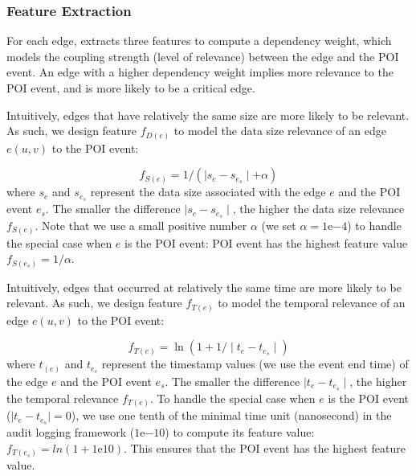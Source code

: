 
\subsubsection{Feature Extraction}
\label{subsubsec:feature-extraction}
For each edge, \tool extracts three features to compute a dependency weight, which models the coupling strength (\ie level of relevance) between the edge and the POI event.
An edge with a higher dependency weight implies more relevance to the POI event, and is more likely to be a critical edge.
%

Intuitively, edges that have relatively the same size are more likely to be relevant.
As such, we design feature $f_{D(e)}$ to model the data size relevance of an edge $e(u, v)$ to the POI event:

\begin{equation}
\label{eq:data-feature}
    f_{S(e)} = 1/(\mid s_{e} - s_{e_s}\mid + \alpha)
\end{equation}
where $s_{e}$ and $s_{e_s}$ represent the data size associated with the edge $e$ and the POI event $e_s$.
The smaller the difference $\mid s_{e} - s_{e_s}\mid$, the higher the data size relevance $f_{S(e)}$.
%
Note that we use a small positive number $\alpha$ (we set $\alpha = 1\mathrm{e}{-4}$) to handle the special case when $e$ is the POI event: POI event has the highest feature value $f_{S(e_s)} = 1/\alpha$.


Intuitively, edges that occurred at relatively the same time are more likely to be relevant.
As such, we design feature $f_{T(e)}$ to model the temporal relevance of an edge $e(u,v)$ to the POI event:

\begin{equation}
\label{eq:time-feature}
    f_{T(e)} = \ln(1 + 1/\mid t_{e} - t_{e_s}\mid)
\end{equation}
where $t_{(e)}$ and $t_{e_s}$ represent the timestamp values (we use the event end time) of the edge $e$ and the POI event $e_s$. 
The smaller the difference $\mid t_{e} - t_{e_s}\mid$, the higher the temporal relevance $f_{T(e)}$.
%
To handle the special case when $e$ is the POI event (\ie $\mid t_{e} - t_{e_s}\mid = 0$), we use one tenth of the minimal time unit (nanosecond) in the audit logging framework (\ie $1\mathrm{e}{-10}$) to compute its feature value: $f_{T(e_s)} = ln(1 + 1\mathrm{e}{10})$. 
This ensures that the POI event has the highest feature value.


